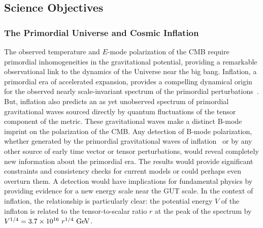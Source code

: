 
\subsection{Science Objectives}
\label{sec:science}

\vspace{-0.05in}
 
\subsubsection{The Primordial Universe and Cosmic Inflation}

\vspace{-0.05in}

The observed temperature and $E$-mode polarization of the \ac{CMB} require primordial inhomogeneities in the 
gravitational potential, providing a remarkable observational link to the dynamics of the Universe near the big bang.
Inflation, a primordial era of accelerated expansion, provides a compelling 
dynamical origin for the observed nearly scale-invariant spectrum of the primordial perturbations~\cite{guth81,linde82,albrecht82,sato81,kolb94}. 
But, inflation also predicts an as yet unobserved spectrum of primordial gravitational waves sourced directly by 
quantum fluctuations of the tensor component of the metric. These gravitational waves make a distinct B-mode imprint on the polarization of the \ac{CMB}. 
Any detection of B-mode polarization, whether generated by the primordial gravitational waves of 
inflation~\cite{kamionkowski97a,zaldarriaga97} or by any other source of early time vector or tensor perturbations, 
would reveal completely new information about the primordial era. The results would provide significant constraints 
and consistency checks for current models or could perhaps even overturn them. A detection would have 
implications for fundamental physics by providing evidence for a new energy scale near the GUT scale. 
In the context of inflation, the relationship is particularly clear: the 
potential energy $V$ of the inflaton is related to the tensor-to-scalar ratio $r$ at the peak of the 
spectrum by $V^{1/4} = 3.7 \times 10^{16} \ r^{1/4}\,\, {\rm GeV}$. 

